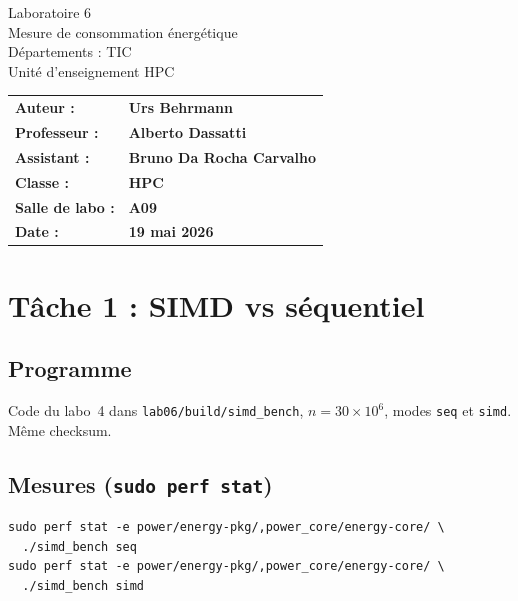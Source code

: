 \documentclass[a4paper,12pt]{article}
\begin{document}
\thispagestyle{firstpage}

\vspace*{2cm}
\begin{center}
    \Huge Laboratoire 6 \\
    \vspace{0.2cm}
    \Large Mesure de consommation énergétique \\
    \vspace{1cm}
    \small Départements : TIC\\
    Unité d'enseignement HPC\\
\end{center}

\vspace{9cm}
\renewcommand{\arraystretch}{1.5}
\begin{flushleft}
    \begin{tabular}{@{}l l@{}}
        \textbf{Auteur :}        & \textbf{Urs Behrmann} \\
        \textbf{Professeur :}    & \textbf{Alberto Dassatti} \\
        \textbf{Assistant :}     & \textbf{Bruno Da Rocha Carvalho} \\
        \textbf{Classe :}        & \textbf{HPC} \\
        \textbf{Salle de labo :} & \textbf{A09} \\
        \textbf{Date :}          & \textbf{19 mai 2026} \\
    \end{tabular}
\end{flushleft}

\newpage
\pagestyle{otherpages}

\section{Tâche 1 : SIMD vs séquentiel}

\subsection{Programme}
Code du labo~4 dans \texttt{lab06/build/simd\_bench}, $n = 30 \times 10^6$, modes \texttt{seq} et \texttt{simd}. Même checksum.

\subsection{Mesures (\texttt{sudo perf stat})}
\begin{verbatim}
sudo perf stat -e power/energy-pkg/,power_core/energy-core/ \
  ./simd_bench seq
sudo perf stat -e power/energy-pkg/,power_core/energy-core/ \
  ./simd_bench simd
\end{verbatim}
\end{document}
